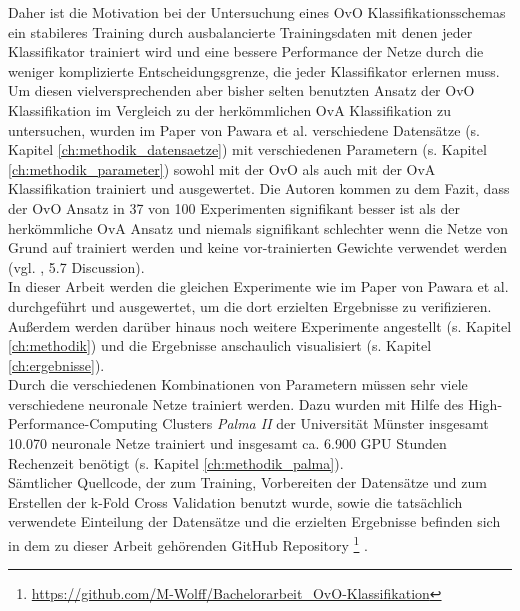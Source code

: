 Daher ist die Motivation bei der Untersuchung eines OvO Klassifikationsschemas ein stabileres Training durch ausbalancierte Trainingsdaten mit denen jeder Klassifikator trainiert wird und eine bessere Performance der Netze durch die weniger komplizierte  Entscheidungsgrenze, die jeder Klassifikator erlernen muss.\\

Um diesen vielversprechenden aber bisher selten benutzten Ansatz der OvO Klassifikation im Vergleich zu der herkömmlichen OvA Klassifikation zu untersuchen, wurden im Paper von Pawara et al. \cite{pawaraPaper} verschiedene Datensätze (s. Kapitel \ref{ch:methodik_datensaetze}) mit verschiedenen Parametern (s. Kapitel \ref{ch:methodik_parameter}) sowohl mit der OvO als auch mit der OvA Klassifikation trainiert und ausgewertet.
Die Autoren kommen zu dem Fazit, dass der OvO Ansatz in 37 von 100 Experimenten signifikant besser ist als der herkömmliche OvA Ansatz und niemals signifikant schlechter wenn die Netze von Grund auf trainiert werden und keine vor-trainierten Gewichte verwendet werden (vgl. \cite{pawaraPaper}, 5.7 Discussion).\\

In dieser Arbeit werden die gleichen Experimente wie im Paper von Pawara et al. \cite{pawaraPaper} durchgeführt und ausgewertet, um die dort erzielten Ergebnisse zu verifizieren. Außerdem werden darüber hinaus noch weitere Experimente angestellt (s. Kapitel \ref{ch:methodik}) und die Ergebnisse anschaulich visualisiert (s. Kapitel \ref{ch:ergebnisse}).\\

Durch die verschiedenen Kombinationen von Parametern müssen sehr viele verschiedene neuronale Netze trainiert werden. Dazu wurden mit Hilfe des High-Performance-Computing Clusters \textit{Palma II} der Universität Münster \cite{palma2} insgesamt 10.070 neuronale Netze trainiert und insgesamt ca. 6.900 GPU Stunden Rechenzeit benötigt (s. Kapitel \ref{ch:methodik_palma}).\\

Sämtlicher Quellcode, der zum Training, Vorbereiten der Datensätze und zum Erstellen der k-Fold Cross Validation benutzt wurde, sowie die tatsächlich verwendete Einteilung der Datensätze und die erzielten Ergebnisse befinden sich in dem zu dieser Arbeit gehörenden GitHub Repository \footnote{\url{https://github.com/M-Wolff/Bachelorarbeit_OvO-Klassifikation}} \cite{githubRepo}.